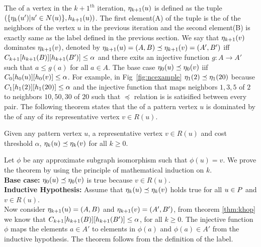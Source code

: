 The \ncl of a vertex in the ${k+1}^{th}$ iteration, $\eta_{k+1}(u)$ is
defined as
the tuple $(\{\eta_{k}(u') | u' \in N(u)\}, h_{k+1}(u))$.
The first element(A) of the tuple is the \ncl of the neighbors of the
vertex $u$ in the previous iteration and the second element(B) is exactly
same as the \khop label defined in the previous section. We say that
$\eta_{k+1}(v)$ dominates $\eta_{k+1}(v)$, denoted by 
$\eta_{k+1}(u) = (A, B) \preceq \eta_{k+1}(v) = (A', B') $ 
iff $C_{k+1}[h_{k+1}(B)][h_{k+1}(B')] \leq \alpha$ and there exits an injective
function $g\!\!:A\rightarrow A'$ such that $a \leq g(a)$ for 
all $a \in A$. The base case $\eta_{0}(u) \preceq \eta_{0}(v)$ iif 
$C_{0}[h_{0}(u)][h_{0}(v)] \leq \alpha$. For example, in Fig~\ref{fig:ncexample} 
$\eta_{1}(2) \preceq \eta_{1}(20)$ because $C_{1}[h_{1}(2)][h_{1}(20)] \leq \alpha$
and the injective function that maps neighbors $1, 3, 5$ of $2$ to neighbors
$10, 50, 30$ of $20$ such that $\preceq$ relation is
is satisified between every pair. The following theorem states that the \ncl of a pattern
vertex $u$ is dominated by the \ncl of any of its representative vertex
$v \in R(u)$.

\begin{thm}
Given any pattern vertex $u$, a representative vertex $v \in R(u)$ and cost
threshold $\alpha$, $\eta_{k}(u) \preceq \eta_{k}(v)$ for all
$k \geq 0$.
\begin{myproof} Let $\phi$ be any approximate subgraph isomorphism
such that $\phi(u) = v$.
We prove the theorem by using the principle of mathematical induction on $k$.\\
\textbf{Base case:} $\eta_{0}(u) \preceq \eta_{0}(v)$ is true because
$v \in R(u)$. \\
\textbf{Inductive Hypothesis:} Assume that $\eta_{k}(u) \preceq \eta_{k}(v)$
holds true for all $u \in P$ and $v \in R(u)$. \\
Now consider 
$\eta_{k+1}(u) = (A, B)$  and $ \eta_{k+1}(v) = (A', B') $, from theorem
\ref{thm:khop} we know that $C_{k+1}[h_{k+1}(B)][h_{k+1}(B')] \leq \alpha$, for all
$k \geq 0$. The injective function $\phi$ maps the elements $a \in A'$ to
elements in $\phi(a)$ and $\phi(a) \in A'$ from the inductive hypothesis.
The theorem follows from the definition of the \ncl label.
\end{myproof}
\end{thm}

